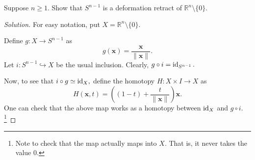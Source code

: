 \documentclass[12pt]{article}
\newenvironment{soln}{\begin{proof}[Solution]}{\end{proof}}
\begin{document}
\begin{exe} \label{exe:deforetractSR}
	Suppose $n \ge 1.$ Show that $S^{n-1}$ is a deformation retract of $\mathbb{R}^n\setminus\{0\}.$
\end{exe}
\begin{soln}
	For easy notation, put $X = \mathbb{R}^n\setminus\{0\}.$

	Define $g:X \to S^{n-1}$ as 
	\begin{equation*} 
		g(\mathbf{x}) = \dfrac{\mathbf{x}}{\|\mathbf{x}\|}.
	\end{equation*}
	Let $i:S^{n-1} \hookrightarrow X$ be the usual inclusion. Clearly, $g\circ i = \operatorname{id}_{S^{n-1}}.$ 

	Now, to see that $i\circ g \simeq \operatorname{id}_{X},$ define the homotopy $H:X\times I \to X$ as
	\begin{equation*} 
		H(\mathbf{x}, t) = \left((1 - t) + \dfrac{t}{\|\mathbf{x}\|}\right)\mathbf{x}.
	\end{equation*}
	One can check that the above map works as a homotopy between $\operatorname{id}_X$ and $g\circ i.$\footnote{Note to check that the map actually maps into $X.$ That is, it never takes the value $0.$}
\end{soln}
\end{document}
